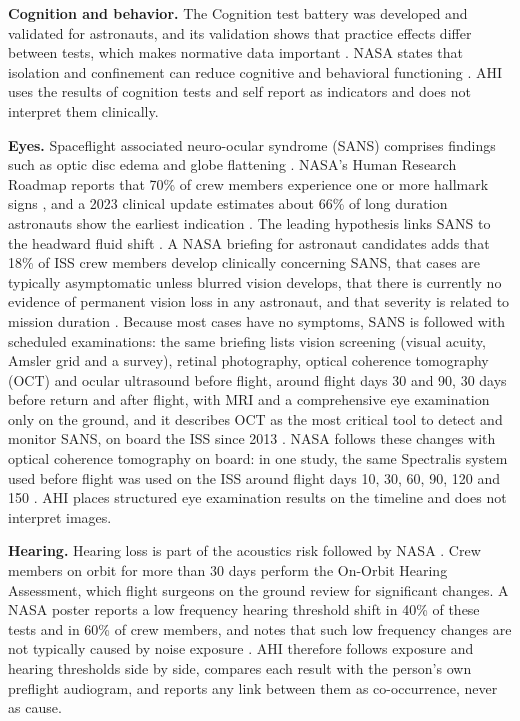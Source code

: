 \medskip\noindent\textbf{Cognition and behavior.} The Cognition test battery was developed and validated for astronauts, and its validation shows that practice effects differ between tests, which makes normative data important \cite{basner2015cognition}. NASA states that isolation and confinement can reduce cognitive and behavioral functioning \cite{nasa_behavioral_health_risk}. AHI uses the results of cognition tests and self report as indicators and does not interpret them clinically.

\medskip\noindent\textbf{Eyes.} Spaceflight associated neuro-ocular syndrome (SANS) comprises findings such as optic disc edema and globe flattening \cite{lee2020sans}. NASA's Human Research Roadmap reports that 70\% of crew members experience one or more hallmark signs \cite{nasa_hrr_sans}, and a 2023 clinical update estimates about 66\% of long duration astronauts show the earliest indication \cite{brunstetter2023sans}. The leading hypothesis links SANS to the headward fluid shift \cite{nasa_fluid_shifts_study}. A NASA briefing for astronaut candidates adds that 18\% of ISS crew members develop clinically concerning SANS, that cases are typically asymptomatic unless blurred vision develops, that there is currently no evidence of permanent vision loss in any astronaut, and that severity is related to mission duration \cite{brunstetter2023brief}. Because most cases have no symptoms, SANS is followed with scheduled examinations: the same briefing lists vision screening (visual acuity, Amsler grid and a survey), retinal photography, optical coherence tomography (OCT) and ocular ultrasound before flight, around flight days 30 and 90, 30 days before return and after flight, with MRI and a comprehensive eye examination only on the ground, and it describes OCT as the most critical tool to detect and monitor SANS, on board the ISS since 2013 \cite{brunstetter2023brief}. NASA follows these changes with optical coherence tomography on board: in one study, the same Spectralis system used before flight was used on the ISS around flight days 10, 30, 60, 90, 120 and 150 \cite{macias2020ocular}. AHI places structured eye examination results on the timeline and does not interpret images.

\medskip\noindent\textbf{Hearing.} Hearing loss is part of the acoustics risk followed by NASA \cite{nasa_ochmo_tb035_acoustics}. Crew members on orbit for more than 30 days perform the On-Orbit Hearing Assessment, which flight surgeons on the ground review for significant changes. A NASA poster reports a low frequency hearing threshold shift in 40\% of these tests and in 60\% of crew members, and notes that such low frequency changes are not typically caused by noise exposure \cite{coste2024hearing}. AHI therefore follows exposure and hearing thresholds side by side, compares each result with the person's own preflight audiogram, and reports any link between them as co-occurrence, never as cause.

